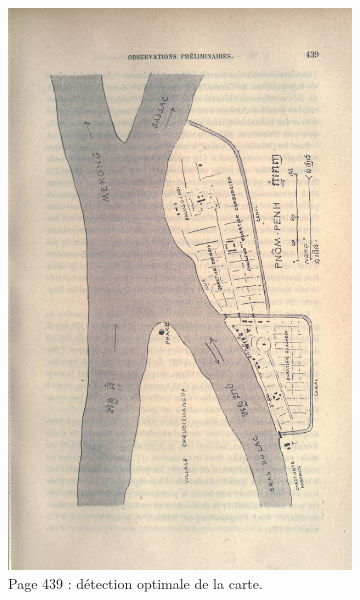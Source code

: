 \begin{figure}
    \centering
    \begin{subfigure}{0.4\textwidth}
     \includegraphics[width=1\linewidth]{img/odm90_439.jpg}
     \caption{Page 439 : détection optimale de la carte.}
     \label{fig:odmfig90439}
    \end{subfigure}
    \hspace{5pt}
    \begin{subfigure}{0.4\textwidth}

\end{subfigure}
\end{figure}
